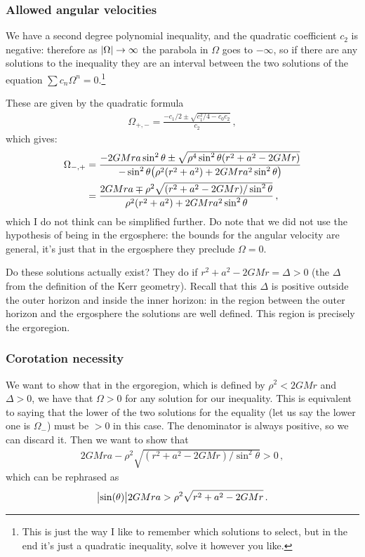 \documentclass[main.tex]{subfiles}
\begin{document}
\subsubsection{Allowed angular velocities}

We have a second degree polynomial inequality, and the quadratic coefficient \(c_2 \) is negative: therefore as \(\abs{\Omega } \rightarrow \infty \) the parabola in \(\Omega \) goes to \(- \infty \), so if there are any solutions to the inequality they are an interval between the two solutions of the equation \(\sum c_{n} \Omega^{n} = 0\).\footnote{This is just the way I like to remember which solutions to select, but in the end it's just a quadratic inequality, solve it however you like.}

These are given by the quadratic formula 
%
\begin{align}
  \Omega_{+, -} = \frac{- c_1/2 \pm \sqrt{c_1^2/4- c_0 c_2  }}{c_2 }
\,,
\end{align}
%
which gives: 
%
\begin{align}
\Omega_{-,+} &= \frac{-2GMra \sin^2\theta \pm \sqrt{\rho^4 \sin^{2}\theta \qty(r^2+a^2-2GMr)}}{- \sin^2\theta \qty(\rho^2(r^2+a^2)+2GMra^2 \sin^2\theta )}  \\
&= \frac{2GMra \mp \rho^2 \sqrt{ \qty(r^2+a^2-2GMr) / \sin^2 \theta }}{\rho^2(r^2+a^2)+2GMra^2 \sin^2\theta }
\,,
\end{align}
%
which I do not think can be simplified further. 
Do note that we did not use the hypothesis of being in the ergosphere: the bounds for the angular velocity are general, it's just that in the ergosphere they preclude \(\Omega = 0\). 

Do these solutions actually exist? They do if \(r^2+a^2-2GMr = \Delta >0\) (the \(\Delta \) from the definition of the Kerr geometry). Recall that this \(\Delta \) is positive outside the outer horizon and inside the inner horizon: in the region between the outer horizon and the ergosphere the solutions are well defined. 
This region is precisely the ergoregion. 

\subsubsection{Corotation necessity}

We want to show that in the ergoregion, which is defined by \(\rho^2 < 2GMr\) and \(\Delta >0\), we have that \(\Omega > 0 \) for any solution for our inequality. This is equivalent to saying that the lower of the two solutions for the equality (let us say the lower one is \(\Omega_-\)) must be \(>0 \) in this case. The denominator is always positive, so we can discard it. Then we want to show that 
%
\begin{align}
2GMra - \rho^2 \sqrt{(r^2+a^2-2GMr) / \sin^2\theta }  > 0
\,,
\end{align}
%
which can be rephrased as 
%
\begin{align}
\abs{\sin(\theta )} 2GMra > \rho^2 \sqrt{r^2+a^2-2GMr}
\,.
\end{align}
\end{document}
